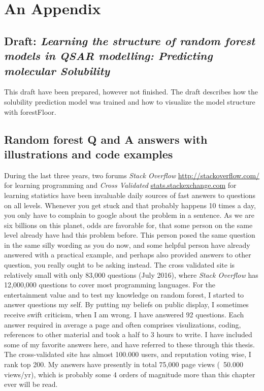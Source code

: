 \chapter{An Appendix}

\section{Draft: \textit{Learning the structure of random forest models in QSAR modelling: Predicting molecular Solubility}}
\label{article:solubility}

This draft have been prepared, however not finished. The draft describes how the solubility prediction model was trained and how to visualize the model structure with forestFloor.



\section{Random forest Q and A answers with illustrations and code examples}

During the last three years, two forums \textit{Stack Overflow} \url{http://stackoverflow.com/} for learning programming and \textit{Cross Validated} \url{stats.stackexchange.com} for learning statistics have been invaluable daily sources of fast answers to questions on all levels. Whenever you get stuck and that probably happens 10 times a day, you only have to complain to google about the problem in a sentence. As we are six billions on this planet, odds are favorable for, that some person on the same level already have had this problem before. This person posed the same question in the same silly wording as you do now, and some helpful person have already answered with a practical example, and perhaps also provided answers to other question, you really ought to be asking instead. The cross validated site is relatively small with only 83,000 questions (July 2016), where \textit{Stack Overflow} has 12,000,000 questions to cover most programming languages. For the entertainment value and to test my knowledge on random forest, I started to answer questions my self. By putting my beliefs on public display, I sometimes receive swift criticism, when I am wrong. I have answered 92 questions. Each answer required in average a page and often comprises visulizations, coding, references to other material and took a half to 3 hours to write. I have included some of my favorite answers here, and have referred to these through this thesis. The cross-validated site has almost 100.000 users, and reputation voting wise, I rank top 200. My answers have presently in total 75,000 page views (~50.000 views/yr), which is probably some 4 orders of magnitude more than this chapter ever will be read.


